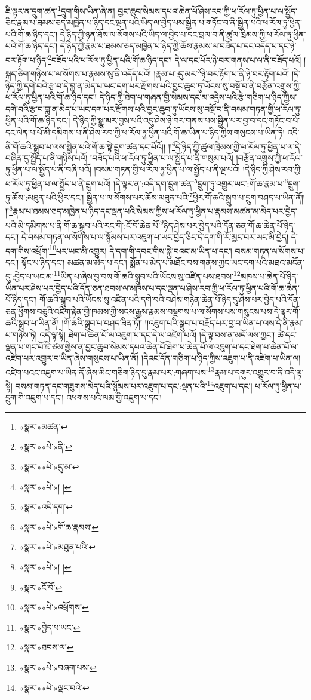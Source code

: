ཇི་ལྟར་ན་དྲུག་ཚན་\footnote{«སྣར་»མཚན་}དྲུག་གིས་ཡིན་ཞེ་ན། བྱང་ཆུབ་སེམས་དཔའ་ཆེན་པོ་ཤེས་རབ་ཀྱི་ཕ་རོལ་ཏུ་ཕྱིན་པ་ལ་སྤྱོད་ཅིང་རྣམ་པ་ཐམས་ཅད་མཁྱེན་པ་ཉིད་དང་ལྡན་པའི་ཡིད་ལ་བྱེད་པས་སྦྱིན་པ་གཏོང་བ་ནི་སྦྱིན་པའི་ཕ་རོལ་ཏུ་ཕྱིན་པའི་གོ་ཆ་ཉིད་དང་། དེ་ཉིད་ཀྱི་ཉན་ཐོས་ལ་སོགས་པའི་ཡིད་ལ་བྱེད་པ་དང་བྲལ་བ་ནི་ཚུལ་ཁྲིམས་ཀྱི་ཕ་རོལ་ཏུ་ཕྱིན་པའི་གོ་ཆ་ཉིད་དང་། དེ་ཉིད་ཀྱི་རྣམ་པ་ཐམས་ཅད་མཁྱེན་པ་ཉིད་ཀྱི་ཆོས་རྣམས་ལ་བཟོད་པ་དང་འདོད་པ་དང་ཉེ་བར་རྟོག་པ་ཉིད་\footnote{«སྣར་»«པེ་»ནི་}བཟོད་པའི་ཕ་རོལ་ཏུ་ཕྱིན་པའི་གོ་ཆ་ཉིད་དང་། དེ་ལ་དང་པོར་ཉེ་བར་གནས་པ་ལ་ནི་བཟོད་པའོ། །སྐད་ཅིག་གཉིས་པ་ལ་སོགས་པ་རྣམས་སུ་ནི་འདོད་པའོ། །རྣམ་པ་:དུ་མར་\footnote{«སྣར་»«པེ་»དུ་མ་}ཉེ་བར་རྟོག་པ་ནི་ཉེ་བར་རྟོག་པའོ། །དེ་ཉིད་ཀྱི་དགེ་བའི་རྩ་བ་དེ་བླ་ན་མེད་པ་ཡང་དག་པར་རྫོགས་པའི་བྱང་ཆུབ་ཏུ་ཡོངས་སུ་བསྔོ་བ་ནི་བརྩོན་འགྲུས་ཀྱི་ཕ་རོལ་ཏུ་ཕྱིན་པའི་གོ་ཆ་ཉིད་དང་། དེ་ཉིད་ཀྱི་ཐེག་པ་གཞན་གྱི་སེམས་དང་མ་འདྲེས་པའི་རྩེ་གཅིག་པ་ཉིད་ཀྱིས་དགེ་བའི་རྩ་བ་བླ་ན་མེད་པ་ཡང་དག་པར་རྫོགས་པའི་བྱང་ཆུབ་ཏུ་ཡོངས་སུ་བསྔོ་བ་ནི་བསམ་གཏན་གྱི་ཕ་རོལ་ཏུ་ཕྱིན་པའི་གོ་ཆ་ཉིད་དང་། དེ་ཉིད་ཀྱི་སྒྱུ་མར་བྱས་པའི་འདུ་ཤེས་ཉེ་བར་གནས་པས་སྦྱིན་པར་བྱ་བ་དང་གཏོང་བ་པོ་དང་ལེན་པ་པོ་མི་དམིགས་པ་ནི་ཤེས་རབ་ཀྱི་ཕ་རོལ་ཏུ་ཕྱིན་པའི་གོ་ཆ་ཡིན་པ་ཉིད་ཀྱིས་གསུངས་པ་ཡིན་ཏེ། འདི་ནི་གོ་ཆའི་སྒྲུབ་པ་ལས་སྦྱིན་པའི་གོ་ཆ་སྟེ་དྲུག་ཚན་དང་པོའོ།། །།\footnote{«སྣར་»«པེ་»། །}དེ་ཉིད་ཀྱི་ཚུལ་ཁྲིམས་ཀྱི་ཕ་རོལ་ཏུ་ཕྱིན་པ་ལ་དེ་བཞིན་དུ་སྤྱོད་པ་ནི་གཉིས་པའོ། །བཟོད་པའི་ཕ་རོལ་ཏུ་ཕྱིན་པ་ལ་སྤྱོད་པ་ནི་གསུམ་པའོ། །བརྩོན་འགྲུས་ཀྱི་ཕ་རོལ་ཏུ་ཕྱིན་པ་ལ་སྤྱོད་པ་ནི་བཞི་པའོ། །བསམ་གཏན་གྱི་ཕ་རོལ་ཏུ་ཕྱིན་པ་ལ་སྤྱོད་པ་ནི་ལྔ་པའོ། །དེ་ཉིད་ཀྱི་ཤེས་རབ་ཀྱི་ཕ་རོལ་ཏུ་ཕྱིན་པ་ལ་སྤྱོད་པ་ནི་དྲུག་པའོ། །དེ་ལྟར་ན་:འདི་དག་དྲུག་ཚན་\footnote{«སྣར་»འདི་དག་}དྲུག་ཏུ་འགྱུར་ཡང་:གོ་ཆ་རྣམ་པ་\footnote{«སྣར་»«པེ་»གོ་ཆ་རྣམས་}དྲུག་ཏུ་ཆོས་:མཐུན་པའི་ཕྱིར་དང་། སྦྱིན་པ་ལ་སོགས་པར་ཆོས་མཐུན་པའི་\footnote{«སྣར་»«པེ་»མཐུན་པའི་}ཕྱིར་གོ་ཆའི་སྒྲུབ་པ་དྲུག་བཤད་པ་ཡིན་ནོ།། །།\footnote{«སྣར་»«པེ་»། །}རྣམ་པ་ཐམས་ཅད་མཁྱེན་པ་ཉིད་དང་ལྡན་པའི་སེམས་ཀྱིས་ཕ་རོལ་ཏུ་ཕྱིན་པ་རྣམས་མཚན་མ་མེད་པར་བྱེད་པའི་མི་དམིགས་པ་ནི་གོ་ཆ་སྒྲུབ་པའི་རང་གི་:ངོ་བོ་ཆེན་པོ་\footnote{«སྣར་»ངོ་བོ་}ཉིད་ཤེས་པར་བྱེད་པའི་དོན་ཅན་གོ་ཆ་ཆེན་པོ་ཉིད་དང་། དེ་བསམ་གཏན་ལ་སོགས་པ་ལ་སྙོམས་པར་འཇུག་པ་ཡང་བྱེད་ཅིང་དེ་དག་གི་རོ་མྱང་བར་ཡང་མི་བྱེད། དེ་དག་གིས་འཕྲོག་\footnote{«སྣར་»«པེ་»འཕྲོགས་}པར་ཡང་མི་འགྱུར། དེ་དག་གི་དབང་གིས་སྐྱེ་བའང་མ་ཡིན་པ་དང་། བསམ་གཏན་ལ་སོགས་པ་དང་། སྟོང་པ་ཉིད་དང་། མཚན་མ་མེད་པ་དང་། སྨོན་པ་མེད་པ་མཐོང་བས་གནས་ཀྱང་ཡང་དག་པའི་མཐའ་མངོན་དུ་:བྱེད་པ་ཡང་མ་\footnote{«སྣར་»བྱེད་པ་ཡང་}ཡིན་པ་ཞེས་བྱ་བས་གོ་ཆའི་སྒྲུབ་པའི་ཡོངས་སུ་འཛིན་པས་ཐབས་\footnote{«སྣར་»ཐབས་ལ་}མཁས་པ་ཆེན་པོ་ཉིད་ཡིན་པར་ཤེས་པར་བྱེད་པའི་དོན་ཅན་ཐབས་ལ་མཁས་པ་དང་ལྡན་པ་ཤེས་རབ་ཀྱི་ཕ་རོལ་ཏུ་ཕྱིན་པའི་གོ་ཆ་ཆེན་པོ་ཉིད་དང་། གོ་ཆའི་སྒྲུབ་པའི་ཡོངས་སུ་འཛིན་པའི་དགེ་བའི་བཤེས་གཉེན་ཆེན་པོ་ཉིད་དུ་ཤེས་པར་བྱེད་པའི་དོན་ཅན་ཕྱོགས་བཅུའི་འཇིག་རྟེན་གྱི་ཁམས་ཀྱི་སངས་རྒྱས་རྣམས་བསྔགས་པ་ལ་སོགས་པས་གསུངས་པས་དེ་ལྟར་གོ་ཆའི་སྒྲུབ་པ་ཡིན་ནོ། །གོ་ཆའི་སྒྲུབ་པ་བཤད་ཟིན་ཏོ།། །།འཇུག་པའི་སྒྲུབ་པ་བརྗོད་པར་བྱ་བ་ཡིན་པ་ལས་དེ་ནི་རྣམ་པ་གཉིས་ཏེ། འདི་ལྟ་སྟེ། ཐེག་པ་ཆེན་པོ་ལ་འཇུག་པ་དང་དེ་ལ་འཛེག་པའོ། །དེ་ལྟ་བས་ན་མདོ་ལས་ཀྱང་། ཚེ་དང་ལྡན་པ་གང་པོ་ཇི་ཙམ་གྱིས་ན་བྱང་ཆུབ་སེམས་དཔའ་ཆེན་པོ་ཐེག་པ་ཆེན་པོ་ལ་འཇུག་པ་དང་ཐེག་པ་ཆེན་པོ་ལ་འཛེག་པར་འགྱུར་བ་ཡིན་ཞེས་གསུངས་པ་ཡིན་ནོ། །དེའང་དོན་གཅིག་པ་ཉིད་ཀྱིས་འཇུག་པ་ནི་འཛེག་པ་ཡིན་ལ། འཛེག་པའང་འཇུག་པ་ཡིན་ནོ་ཞེས་མིང་གཅིག་ཉིད་དུ་རྣམ་པར་:གཞག་པས་\footnote{«སྣར་»«པེ་»བཞག་པས་}རྣམ་པ་དགུར་འགྱུར་བ་ནི་འདི་ལྟ་སྟེ། བསམ་གཏན་དང་གཟུགས་མེད་པའི་སྙོམས་པར་འཇུག་པ་དང་:ལྡན་པའི་\footnote{«སྣར་»«པེ་»ལྡང་བའི་}འཇུག་པ་དང་། ཕ་རོལ་ཏུ་ཕྱིན་པ་དྲུག་གི་འཇུག་པ་དང་། འཕགས་པའི་ལམ་གྱི་འཇུག་པ་དང་། 